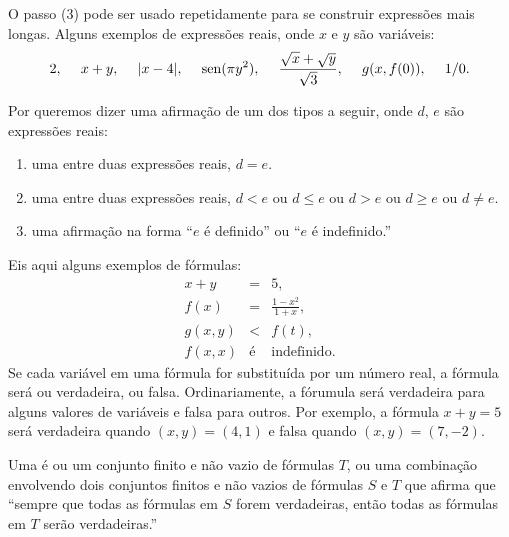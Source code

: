 O passo (3) pode ser usado repetidamente para se construir expressões
mais longas. Alguns exemplos de expressões reais, onde $x$ e $y$ são
variáveis:
\[
2, \hspace{3ex} x+y, \hspace{3ex} |x-4|, \hspace{3ex} \operatorname{sen}(\pi y^2),
\hspace{3ex} \frac{\sqrt{x} + \sqrt{y}}{\sqrt{3}}, \hspace{3ex} g(x,f(0)),
\hspace{3ex} 1/0.
\]

Por  queremos dizer uma afirmação de um dos tipos a seguir,
onde $d$, $e$ são expressões reais:
\begin{enumerate}[(1)]
\item uma  entre duas expressões reais, $d = e$.
\item uma  entre duas expressões reais, $d < e$ ou
      $d \le e$ ou $d > e$ ou $d \ge e$ ou $d \ne e$.
\item uma afirmação na forma ``$e$ é definido'' ou ``$e$ é indefinido.''
\end{enumerate}
Eis aqui alguns exemplos de fórmulas:
\begin{eqnarray*}
  x + y & = & 5, \\
  f(x)  & = & \frac{1 - x^2}{1 + x}, \\
 g(x,y) & < & f(t), \\
 f(x,x) & \text{é} & \text{indefinido}.
\end{eqnarray*}
Se cada variável em uma fórmula for substituída por um número real, a
fórmula será ou verdadeira, ou falsa. Ordinariamente, a fórumula será
verdadeira para alguns valores de variáveis e falsa para outros. Por
exemplo, a fórmula $x+y = 5$ será verdadeira quando $(x,y) = (4,1)$
e falsa quando $(x,y) = (7,-2)$.

\begin{defin}
Uma 
é ou um conjunto finito e não vazio
de fórmulas $T$, ou uma combinação envolvendo dois conjuntos finitos e
não vazios de fórmulas $S$ e $T$ que afirma que ``sempre que todas as
fórmulas em $S$ forem verdadeiras, então todas as fórmulas em $T$ serão
verdadeiras.''
\end{defin}

